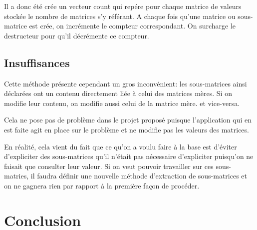 \documentclass[a4paper,11pt]{article}
\begin{document}
Il a donc été crée un vecteur count qui repére pour chaque matrice de valeurs stockée le nombre de matrices s'y référant. A chaque fois qu'une matrice ou sous-matrice est crée, on incrémente le compteur correspondant. On surcharge le destructeur pour qu'il décrémente ce compteur.

\subsection{Insuffisances}

Cette méthode présente cependant un gros inconvénient: les sous-matrices ainsi déclarées ont un contenu directement liée à celui des matrices mères. Si on modifie leur contenu, on modifie aussi celui de la matrice mère. et vice-versa.

Cela ne pose pas de problème dans le projet proposé puisque l'application qui en est faite agit en place sur le problème et ne modifie pas les valeurs des matrices.

En réalité, cela vient du fait que ce qu'on a voulu faire à la base est d'éviter d'expliciter des sous-matrices qu'il n'était pas nécessaire d'expliciter puisqu'on ne faisait que consulter leur valeur. Si on veut pouvoir travailler sur ces sous-matries, il faudra définir une nouvelle méthode d'extraction de sous-matrices et on ne gagnera rien par rapport à la première façon de procéder.

\section*{Conclusion}
\end{document}
